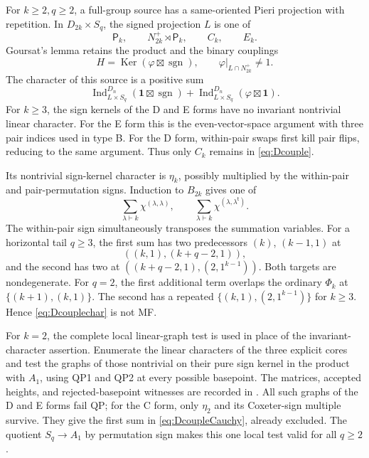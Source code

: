 \documentclass[11pt]{article}
\numberwithin{equation}{section}
\theoremstyle{definition}
\DeclareMathOperator{\Ind}{Ind}
\DeclareMathOperator{\sgn}{sgn}
\DeclareMathOperator{\Ker}{Ker}
\newcommand{\one}{\mathbf 1}
\newcommand{\transpose}{\mathsf t}
\newcommand{\pair}{\mathsf P}
\begin{document}
For \(k\geq2,q\geq2\), a full-group source has a same-oriented Pieri projection with repetition.
In \(D_{2k}\times S_q\), the signed projection \(L\) is one of
\[
 \pair_k,\qquad N_{2k}^+\rtimes\pair_k,\qquad C_k,\qquad E_k .
\]
Goursat's lemma retains the product and the binary couplings
\begin{equation}
 H=\Ker(\varphi\boxtimes\sgn),\qquad
 \varphi|_{L\cap N_{2k}^+}\ne1 .
 \label{eq:Dcouple}
\end{equation}
The character of this source is a positive sum
\begin{equation}
 \Ind_{L\times S_q}^{D_n}(\one\boxtimes\sgn)
 +\Ind_{L\times S_q}^{D_n}(\varphi\boxtimes\one).
 \label{eq:Dcouplechar}
\end{equation}
For \(k\geq3\), the sign kernels of the D and E forms have no invariant nontrivial linear character.
For the E form this is the even-vector-space argument with three pair indices used in type B.
For the D form, within-pair swaps first kill pair flips, reducing to the same argument.
Thus only \(C_k\) remains in \eqref{eq:Dcouple}.

Its nontrivial sign-kernel character is \(\eta_k\), possibly multiplied by the within-pair and pair-permutation signs.
Induction to \(B_{2k}\) gives one of
\begin{equation}
 \sum_{\lambda\vdash k}\chi^{(\lambda,\lambda)},\qquad
 \sum_{\lambda\vdash k}\chi^{(\lambda,\lambda^\transpose)}.
 \label{eq:DcoupleCauchy}
\end{equation}
The within-pair sign simultaneously transposes the summation variables.
For a horizontal tail \(q\geq3\), the first sum has two predecessors \((k)\), \((k-1,1)\) at
\[
 ((k,1),(k+q-2,1)),
\]
and the second has two at
\(((k+q-2,1),(2,1^{k-1}))\).
Both targets are nondegenerate.
For \(q=2\), the first additional term overlaps the ordinary \(\Phi_k\) at
\(\{(k+1),(k,1)\}\).
The second has a repeated \(\{(k,1),(2,1^{k-1})\}\) for \(k\geq3\).
Hence \eqref{eq:Dcouplechar} is not MF.

For \(k=2\), the complete local linear-graph test is used in place of the invariant-character assertion.
Enumerate the linear characters of the three explicit cores and test the graphs of those nontrivial on their pure sign kernel in the product with \(A_1\), using QP1 and QP2 at every possible basepoint.
The matrices, accepted heights, and rejected-basepoint witnesses are recorded in \cite{ZhangData}.
All such graphs of the D and E forms fail QP; for the C form, only \(\eta_2\) and its Coxeter-sign multiple survive.
They give the first sum in \eqref{eq:DcoupleCauchy}, already excluded.
The quotient \(S_q\to A_1\) by permutation sign makes this one local test valid for all \(q\geq2\).
\end{document}
